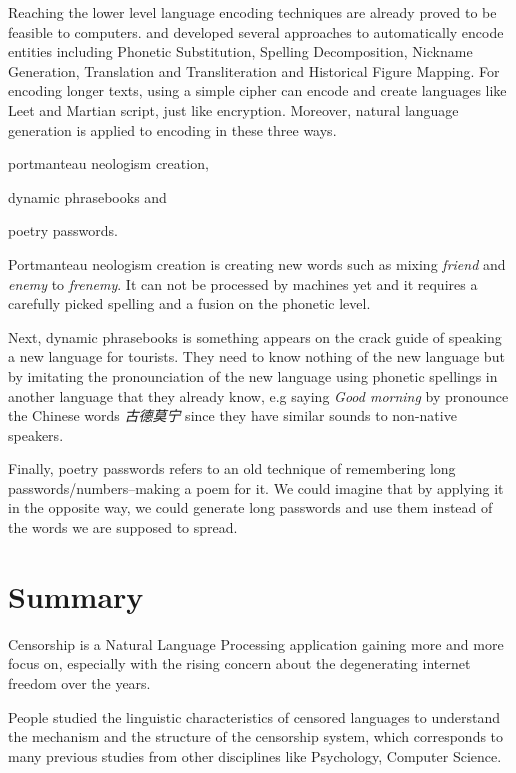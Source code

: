 \documentclass[11pt]{article} %
\begin{document}
Reaching the lower level language encoding techniques are already proved to be feasible to computers. \cite{zhang2014appropriate} and \cite{zhang2015context} developed several approaches to automatically encode entities including Phonetic Substitution, Spelling Decomposition, Nickname Generation, Translation and Transliteration and Historical Figure Mapping. For encoding longer texts, using a simple cipher can encode and create languages like Leet and Martian script, just like encryption. Moreover, natural language generation is applied to encoding in these three ways.
\begin {enumerate*}[label=\emph{\alph*})]
\item portmanteau neologism creation, \item dynamic phrasebooks and \item poetry passwords.
\end {enumerate*}

Portmanteau neologism creation \cite{deri2015make} is creating new words such as mixing \textit{friend} and \textit{enemy} to \textit{frenemy}. It can not be processed by machines yet and it requires a carefully picked spelling and a fusion on the phonetic level.

Next, dynamic phrasebooks \cite{shi2014speak} is something appears on the crack guide of speaking a new language for tourists. They need to know nothing of the new language but by imitating the pronounciation of the new language using phonetic spellings in another language that they already know, e.g saying \textit{Good morning} by pronounce the Chinese words \textit{古德莫宁} since they have similar sounds to non-native speakers.

Finally, poetry passwords \cite{greene2010automatic} refers to an old technique of remembering long passwords/numbers--making a poem for it. We could imagine that by applying it in the opposite way, we could generate long passwords and use them instead of the words we are supposed to spread.

\section{Summary}

Censorship is a Natural Language Processing application gaining more and more focus on, especially with the rising concern about the degenerating internet freedom over the years.

People studied the linguistic characteristics of censored languages to understand the mechanism and the structure of the censorship system, which corresponds to many previous studies from other disciplines like Psychology, Computer Science.
\end{document}
